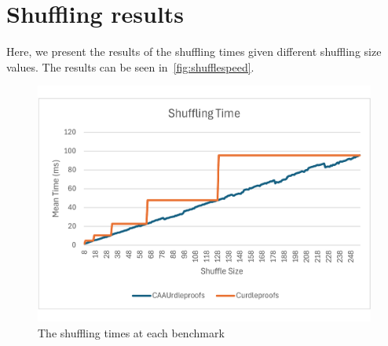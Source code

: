 \clearpage
\section{Shuffling results}\label{sec:shuffling-results}
Here, we present the results of the shuffling times given different shuffling size values.
The results can be seen in~\autoref{fig:shufflespeed}.
\begin{figure}[!htb]
    \includegraphics[width=0.99\columnwidth]{figures/results/shufflingtime}
    \caption{The shuffling times at each benchmark}%
    \label{fig:shufflespeed}%
\end{figure}
